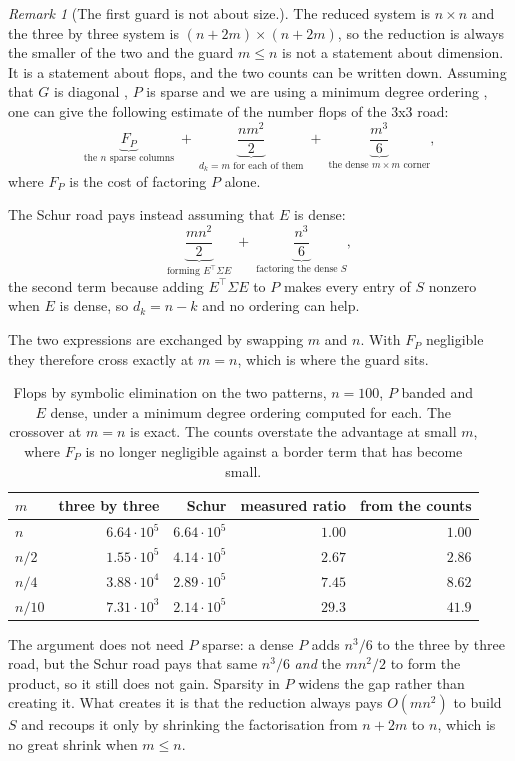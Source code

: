 \documentclass[a4paper,11pt]{book}
\theoremstyle{plain}
\theoremstyle{definition}
\theoremstyle{remark}
\newtheorem{remark}[theorem]{Remark}
\numberwithin{equation}{chapter}
\numberwithin{algorithm}{chapter}
\begin{document}
	\begin{remark}[The first guard is not about size.]
	The reduced system is $n\times n$ and the three by three system is
	$(n+2m)\times(n+2m)$, so the reduction is always the smaller of the two and
	the guard $m\leq n$ is not a statement about dimension. It is a statement
	about flops, and the two counts can be written down.
    Assuming that $G$ is diagonal , $P$ is sparse and we are using a minimum degree ordering , one can give the following estimate of the number flops of the 3x3 road:
	\[
	\underbrace{F_P}_{\text{the }n\text{ sparse columns}}
	\;+\;
	\underbrace{\frac{nm^2}{2}}_{d_k=m\text{ for each of them}}
	\;+\;
	\underbrace{\frac{m^3}{6}}_{\text{the dense }m\times m\text{ corner}} ,
	\]
	where $F_P$ is the cost of factoring $P$ alone. 

	The Schur road pays instead assuming that $E$ is dense:
	\[
	\underbrace{\frac{mn^2}{2}}_{\text{forming }E^{\top}\Sigma E}
	\;+\;
	\underbrace{\frac{n^3}{6}}_{\text{factoring the dense }S} ,
	\]
	the second term because adding $E^{\top}\Sigma E$ to $P$ makes every entry of
	$S$ nonzero when $E$ is dense, so $d_k=n-k$ and no ordering can help.

	The two expressions are exchanged by swapping $m$ and $n$. With $F_P$
	negligible they therefore cross exactly at $m=n$, which is where the guard
	sits.

	\begin{table}[H]
		\centering\small
		\begin{tabular}{lrrrr}
			\toprule
			$m$ & three by three & Schur & measured ratio & from the counts\\
			\midrule
			$n$ & $6.64\cdot10^{5}$ & $6.64\cdot10^{5}$ & $1.00$ & $1.00$\\
			$n/2$ & $1.55\cdot10^{5}$ & $4.14\cdot10^{5}$ & $2.67$ & $2.86$\\
			$n/4$ & $3.88\cdot10^{4}$ & $2.89\cdot10^{5}$ & $7.45$ & $8.62$\\
			$n/10$ & $7.31\cdot10^{3}$ & $2.14\cdot10^{5}$ & $29.3$ & $41.9$\\
			\bottomrule
		\end{tabular}
		\caption{Flops by symbolic elimination on the two patterns, $n=100$, $P$
			banded and $E$ dense, under a minimum degree ordering computed for each.
			The crossover at $m=n$ is exact. The counts overstate the advantage at
			small $m$, where $F_P$ is no longer negligible against a border term that
			has become small.}
	\end{table}

The argument does not need $P$
	sparse: a dense $P$ adds $n^3/6$ to the three by three road, but the Schur
	road pays that same $n^3/6$ \emph{and} the $mn^2/2$ to form the product, so it
	still does not gain. Sparsity in $P$ widens the gap rather than creating it.
	What creates it is that the reduction always pays $O(mn^2)$ to build $S$ and
	recoups it only by shrinking the factorisation from $n+2m$ to $n$, which is no
	great shrink when $m\leq n$.
\end{remark}
\end{document}
